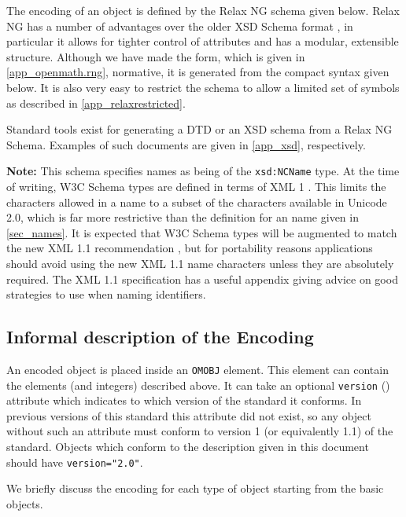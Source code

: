 The \XML encoding of an \OM object is defined by the Relax NG schema \cite{RELAX} given
below.  Relax NG has a number of advantages over the older XSD Schema format \cite{XSD},
in particular it allows for tighter control of attributes and has a modular, extensible
structure.  Although we have made the \XML form, which is given in \ref{app_openmath.rng},
normative, it is generated from the compact syntax given below.  It is also very easy to
restrict the schema to allow a limited set of \OM symbols as described in
\ref{app_relaxrestricted}.

Standard tools exist for generating a DTD or an XSD schema from a Relax NG Schema.
Examples of such documents are given in \ref{app_xsd}, respectively.



\textbf{Note:} This schema specifies names as being of the \lstinline|xsd:NCName| type. At
the time of writing, W3C Schema types are defined in terms of XML 1 \cite{xml_98}.  This
limits the characters allowed in a name to a subset of the characters available in Unicode
2.0, which is far more restrictive than the definition for an \OM name given in
\ref{sec_names}.  It is expected that W3C Schema types will be augmented to match the new
XML 1.1 recommendation \cite{xml_04}, but for portability reasons applications should
avoid using the new XML 1.1 name characters unless they are absolutely required.  The XML
1.1 specification has a useful appendix giving advice on good strategies to use when
naming identifiers.

\subsection{Informal description of the \XML Encoding}\label{sec_xml-desc}

An encoded \OM object is placed inside an \lstinline|OMOBJ| element.  This 
element can contain the elements (and integers) described above.
 It can take an optional
\lstinline|version| (\XML) attribute which indicates to
which version of the \OM standard it conforms.  In previous versions of
this standard this attribute did not exist, so any \OM object without
such an attribute must conform to version 1 (or equivalently 1.1) of the
\OM standard.  Objects which conform to the description given in this
document should have \lstinline|version="2.0"|.

We briefly discuss the \XML encoding for each type of \OM object starting from the basic
objects.


